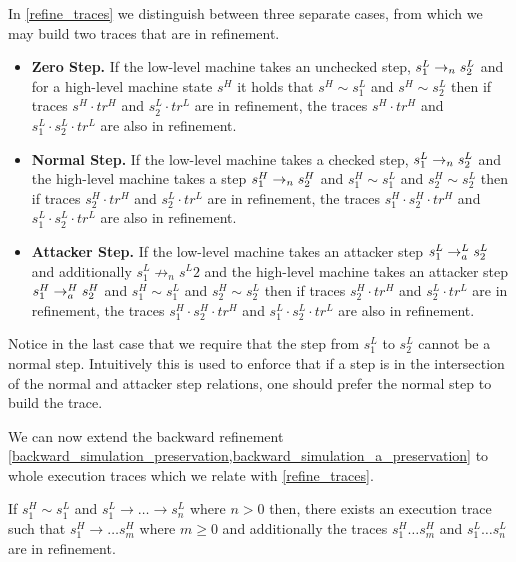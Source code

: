 In \cref{refine_traces} we distinguish between three separate cases,
from which we may build two traces that are in refinement.
\begin{itemize}
\item [] \textbf{Zero Step.} If the low-level machine takes an
  unchecked step, $\stepn{s^L_1}{s^L_2}$ and for a high-level machine
  state $s^H$ it holds that $s^H \sim s^L_1$ and $s^H \sim s^L_2$ then
  if traces $s^H \cdot tr^H$ and $s^L_2 \cdot tr^L$ are in refinement, the
  traces $s^H \cdot tr^H$ and $s^L_1 \cdot s^L_2 \cdot tr^L$ are also in
  refinement.
\item [] \textbf{Normal Step.} If the low-level machine takes a checked step,
  $\stepn{s^L_1}{s^L_2}$ and the high-level machine takes a step
  $\stepn{s^H_1}{s^H_2}$ and $s^H_1 \sim s^L_1$ and $s^H_2 \sim s^L_2$ then
  if traces $s^H_2 \cdot tr^H$ and $s^L_2 \cdot tr^L$ are in refinement, the
  traces $s^H_1 \cdot s^H_2 \cdot tr^H$ and $s^L_1 \cdot s^L_2 \cdot tr^L$ are also in
  refinement.
\item [] \textbf{Attacker Step.} If the low-level machine takes an
  attacker step $\stepa{s^L_1}{s^L_2}{L}$ and additionally $s^L_1 \not
  \to_n s^L2$ and the high-level machine takes an attacker step
  $\stepa{s^H_1}{s^H_2}{H}$ and $s^H_1 \sim s^L_1$ and $s^H_2 \sim
  s^L_2$ then if traces $s^H_2 \cdot tr^H$ and $s^L_2 \cdot tr^L$ are in
  refinement, the traces $s^H_1 \cdot s^H_2 \cdot tr^H$ and $s^L_1 \cdot s^L_2
  \cdot tr^L$ are also in refinement.
\end{itemize}

Notice in the last case that we require that the step from $s^L_1$ to
$s^L_2$ cannot be a normal step. Intuitively this is used to enforce
that if a step is in the intersection of the normal and attacker step
relations, one should prefer the normal step to build the trace.

We can now extend the backward refinement
\cref{backward_simulation_preservation,backward_simulation_a_preservation}
to whole execution traces which we relate with \cref{refine_traces}.

\begin{theorem}
  \label{backward_refinement_traces}
  If $s^H_1 \sim s^L_1$ and $s^L_1 \to \ldots \to s^L_n$ where $n > 0$ then,
  there exists an execution trace such that $s^H_1 \to \ldots s^H_m$ where
  $m \geq 0$ and additionally the traces $s^H_1 \ldots s^H_m$ and
  $s^L_1 \ldots s^L_n$ are in refinement.
\end{theorem}


